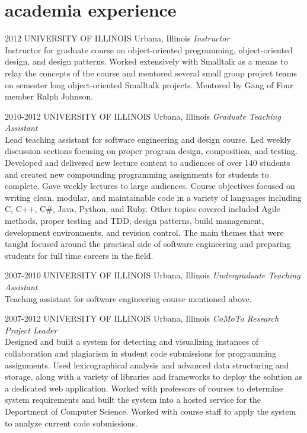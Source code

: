 \documentclass{friggeri-cv} %
\begin{document}
\section{academia experience}

\begin{entrylist}
\entry
{2012}
{UNIVERSITY OF ILLINOIS}
{Urbana, Illinois}
{\emph{Instructor} \\
Instructor for graduate course on object-oriented programming, object-oriented design, and design patterns. Worked
extensively with Smalltalk as a means to relay the concepts of the course and mentored several small group project
teams on semester long object-oriented Smalltalk projects. Mentored by Gang of Four member Ralph Johnson.}
\end{entrylist}
\begin{entrylist}
\entry
{2010-2012}
{UNIVERSITY OF ILLINOIS}
{Urbana, Illinois}
{\emph{Graduate Teaching Assistant} \\
Lead teaching assistant for software engineering and design course. Led weekly discussion sections focusing on proper program design, composition, and testing. Developed and delivered new lecture content to audiences of over 140 students and created new compounding programming assignments for students to complete. Gave weekly lectures to large audiences. Course objectives focused on writing clean, modular, and maintainable code in a variety of languages including C, C++, C\#, Java, Python, and Ruby. Other topics covered included Agile methods, proper testing and TDD, design patterns, build management, development environments, and revision control. The main themes that were taught focused around the practical side of software engineering and preparing students for full time careers in the field.}
\end{entrylist}
\begin{entrylist}
\entry
{2007-2010}
{UNIVERSITY OF ILLINOIS}
{Urbana, Illinois}
{\emph{Undergraduate Teaching Assistant} \\
Teaching assistant for software engineering course mentioned above.}
\end{entrylist}
\begin{entrylist}
\entry
{2007-2012}
{UNIVERSITY OF ILLINOIS}
{Urbana, Illinois}
{\emph{CoMoTo Research Project Leader} \\
Designed and built a system for detecting and visualizing instances of collaboration and plagiarism in student code
submissions for programming assignments. Used lexicographical analysis and advanced data structuring and storage,
along with a variety of libraries and frameworks to deploy the solution as a dedicated web application. Worked with
professors of courses to determine system requirements and built the system into a hosted service for the Department of
Computer Science. Worked with course staff to apply the system to analyze current code submissions.}
\end{entrylist}
\end{document}
